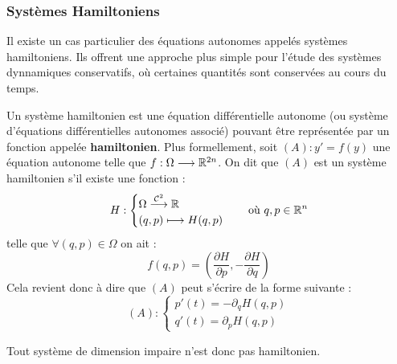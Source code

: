 \subsubsection{Systèmes Hamiltoniens}

Il existe un cas particulier des équations autonomes appelés systèmes hamiltoniens. Ils offrent une approche plus 
simple pour l'étude des systèmes dynnamiques conservatifs, où certaines quantités sont conservées au cours du temps. 

\begin{definition}
    Un système hamiltonien est une équation différentielle autonome (ou système d'équations différentielles autonomes associé) 
    pouvant être représentée par un fonction appelée \textbf{hamiltonien}. 
    Plus formellement, soit $(A) : y' = f(y)$ une équation autonome telle que $f : \Omega \longrightarrow \mathbb{R}^{2n}$. 
    On dit que $(A)$ est un système hamiltonien s'il existe une fonction : 
    \[ H : 
        \begin{cases}
            \Omega \overset{ \mathcal{C}^2}{\longrightarrow} \mathbb{R} \\ 
            (q,p) \longmapsto H(q,p) 
        \end{cases} 
        \quad \text{où } q,p \in \mathbb{R}^n \] 
    telle que $ \forall (q,p) \in \Omega$ on ait : 
        \[ \boxed{f(q,p) = \left( \frac{\partial H}{\partial p}, - \frac{\partial H}{\partial q} \right)  } \] 
    Cela revient donc à dire que $(A)$ peut s'écrire de la forme suivante : 
        \[ (A) : 
            \begin{cases}
                p'(t) = - \partial_q H(q,p) \\ 
                q'(t) = \partial_p H(q,p) 
            \end{cases} \] 
\end{definition}

\begin{remark}
    Tout système de dimension impaire n'est donc pas hamiltonien. 
\end{remark}

